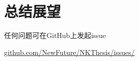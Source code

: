 \chapter{总结展望}

任何问题可在GitHub上发起issue 

\href{https://github.com/NewFuture/NKThesis/issues/new}{github.com/NewFuture/NKThesis/issues/}